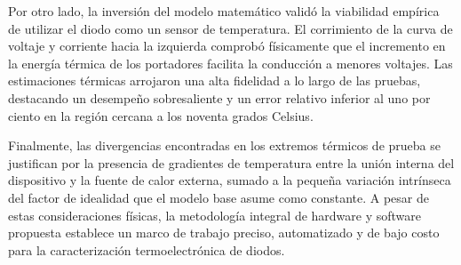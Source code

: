 \documentclass[conference]{IEEEtran}
\begin{document}
Por otro lado, la inversión del modelo matemático validó la viabilidad empírica de utilizar el diodo como un sensor de temperatura. El corrimiento de la curva de voltaje y corriente hacia la izquierda comprobó físicamente que el incremento en la energía térmica de los portadores facilita la conducción a menores voltajes. Las estimaciones térmicas arrojaron una alta fidelidad a lo largo de las pruebas, destacando un desempeño sobresaliente y un error relativo inferior al uno por ciento en la región cercana a los noventa grados Celsius.

Finalmente, las divergencias encontradas en los extremos térmicos de prueba se justifican por la presencia de gradientes de temperatura entre la unión interna del dispositivo y la fuente de calor externa, sumado a la pequeña variación intrínseca del factor de idealidad que el modelo base asume como constante. A pesar de estas consideraciones físicas, la metodología integral de hardware y software propuesta establece un marco de trabajo preciso, automatizado y de bajo costo para la caracterización termoelectrónica de diodos.



\end{document}
